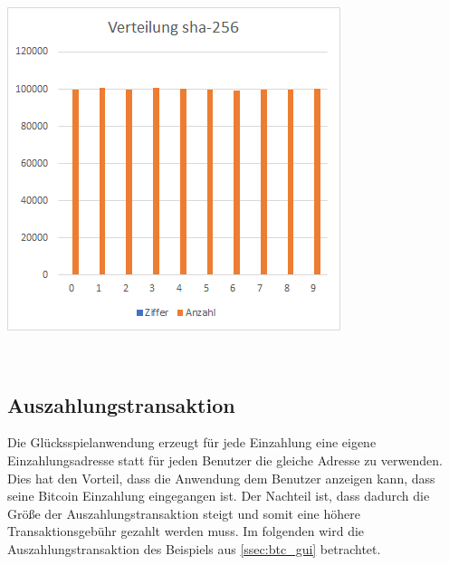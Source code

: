 \begin{minipage}{0.5\textwidth}
\includegraphics[width=\textwidth]{Figures/verteilung_sha256}
\centering
\decoRule
{}
\label{fig:verteilung_sha256}
\end{minipage}
\\
\subsection{Auszahlungstransaktion} \label{sssec:Auszahlungstransaktion}
Die Glücksspielanwendung erzeugt für jede Einzahlung eine eigene Einzahlungsadresse statt für jeden Benutzer die gleiche Adresse zu verwenden. Dies hat den Vorteil, dass die Anwendung dem Benutzer anzeigen kann, dass seine Bitcoin Einzahlung eingegangen ist. Der Nachteil ist, dass dadurch die Größe der Auszahlungstransaktion steigt und somit eine höhere Transaktionsgebühr gezahlt werden muss. Im folgenden wird die Auszahlungstransaktion des Beispiels aus \ref{ssec:btc_gui} betrachtet.


